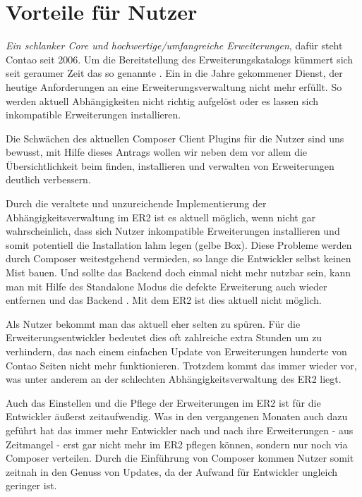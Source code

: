 \documentclass[
paper=a4,
draft=false,%
fontsize=10pt%
]{scrartcl}
\begin{document}
\newpage

%
%

\section{Vorteile für Nutzer}
\label{sec:pros-for-users}

\textit{Ein schlanker Core und hochwertige/umfangreiche Erweiterungen}, dafür steht Contao seit 2006. Um die Bereitstellung des Erweiterungskatalogs kümmert sich seit geraumer Zeit das so genannte . Ein in die Jahre gekommener Dienst, der heutige Anforderungen an eine Erweiterungsverwaltung nicht mehr erfüllt. So werden aktuell Abhängigkeiten nicht richtig aufgelöst oder es lassen sich inkompatible Erweiterungen installieren.

Die Schwächen des aktuellen Composer Client Plugins für die Nutzer sind uns bewusst, mit Hilfe dieses Antrags wollen wir neben dem  vor allem die Übersichtlichkeit beim finden, installieren und verwalten von Erweiterungen deutlich verbessern.

Durch die veraltete und unzureichende Implementierung der Abhängigkeitsverwaltung im ER2 ist es aktuell möglich, wenn nicht gar wahrscheinlich, dass sich Nutzer inkompatible Erweiterungen installieren und somit potentiell die Installation lahm legen (gelbe Box). Diese Probleme werden durch Composer weitestgehend vermieden, so lange die Entwickler selbst keinen Mist bauen. Und sollte das Backend doch einmal nicht mehr nutzbar sein, kann man mit Hilfe des Standalone Modus die defekte Erweiterung auch wieder entfernen und das Backend . Mit dem ER2 ist dies aktuell nicht möglich.

Als Nutzer bekommt man das aktuell eher selten zu spüren. Für die Erweiterungsentwickler bedeutet dies oft zahlreiche extra Stunden um zu verhindern, das nach einem einfachen Update von Erweiterungen hunderte von Contao Seiten nicht mehr funktionieren. Trotzdem kommt das immer wieder vor, was unter anderem an der schlechten Abhängigkeitsverwaltung des ER2 liegt.

Auch das Einstellen und die Pflege der Erweiterungen im ER2 ist für die Entwickler äußerst zeitaufwendig. Was in den vergangenen Monaten auch dazu geführt hat das immer mehr Entwickler nach und nach ihre Erweiterungen - aus Zeitmangel - erst gar nicht mehr im ER2 pflegen können, sondern nur noch via Composer verteilen. Durch die Einführung von Composer kommen Nutzer somit zeitnah in den Genuss von Updates, da der Aufwand für Entwickler ungleich geringer ist.
\end{document}
